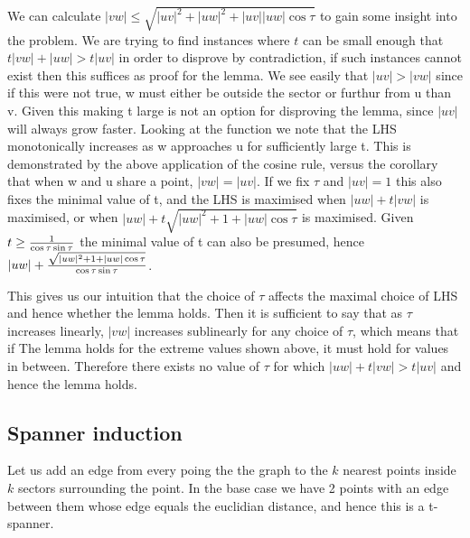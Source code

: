 \documentclass{article}
\begin{document}
We can calculate $|vw| \leq \sqrt{|uv|^2 + |uw|^2 + |uv||uw| \cos \tau}$ to gain some insight into the problem.
We are trying to find instances where $t$ can be small enough that $t|vw| + |uw| > t|uv|$ in order to disprove by contradiction, if such instances cannot exist then this suffices as proof for the lemma.
We see easily that $|uv| > |vw|$ since if this were not true, w must either be outside the sector or furthur from u than v.
Given this making t large is not an option for disproving the lemma, since $|uv|$ will always grow faster.
Looking at the function we note that the LHS monotonically increases as w approaches u for sufficiently large t.
This is demonstrated by the above application of the cosine rule, versus the corollary that when w and u share a point, $|vw| = |uv|$.
If we fix $\tau$ and $|uv| = 1$ this also fixes the minimal value of t, and the LHS is maximised when $|uw| + t|vw|$ is maximised, or when $|uw| + t\sqrt{|uw|^2 + 1 + |uw| \cos \tau}$ is maximised.
Given $t \geq {1 \over {\cos \tau \sin \tau}}$ the minimal value of t can also be presumed, hence $|uw| + {\sqrt{|uw|^2 + 1 + |uw| \cos \tau} \over {\cos \tau \sin \tau}}$.

This gives us our intuition that the choice of $\tau$ affects the maximal choice of LHS and hence whether the lemma holds.
Then it is sufficient to say that as $\tau$ increases linearly, $|vw|$ increases sublinearly for any choice of $\tau$, which means that if The lemma holds for the extreme values shown above, it must hold for values in between.
Therefore there exists no value of $\tau$ for which $|uw| + t|vw| > t|uv|$ and hence the lemma holds.

\subsection*{Spanner induction}

Let us add an edge from every poing the the graph to the $k$ nearest points inside $k$ sectors surrounding the point.
In the base case we have 2 points with an edge between them whose edge equals the euclidian distance, and hence this is a t-spanner.
\end{document}
